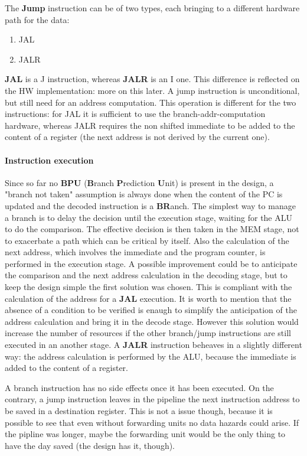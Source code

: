\documentclass[a4paper]{article}
\begin{document}
The \textbf{Jump} instruction can be of two types, each bringing to a different hardware path for the data:
\begin{enumerate}
	\item JAL
	\item JALR
\end{enumerate}
\textbf{JAL} is a J instruction, whereas \textbf{JALR} is an I one. This difference is reflected on the HW implementation: more on this later.
A jump instruction is unconditional, but still need for an address computation. This operation is different for the two instructions: for JAL it is sufficient to use the branch-addr-computation hardware, whereas JALR requires the non shifted immediate to be added to the content of a register (the next address is not derived by the current one).

\paragraph{Instruction execution}
Since so far no \textbf{BPU} (\textbf{B}ranch \textbf{P}rediction \textbf{U}nit) is present in the design, a "branch not taken" assumption is always done when the content of the PC is updated and the decoded instruction is a \textbf{BR}anch. The simplest way to manage a branch is to delay the decision until the execution stage, waiting for the ALU to do the comparison. The effective decision is then taken in the MEM stage, not to exacerbate a path which can be critical by itself. 
Also the calculation of the next address, which involves the immediate and the program counter, is performed in the execution stage.
A possible improvement could be to anticipate the comparison and the next address calculation in the decoding stage, but to keep the design simple the first solution was chosen.
This is compliant with the calculation of the address for a \textbf{JAL} execution. It is worth to mention that the absence of a condition to be verified is enaugh to simplify the anticipation of the address calculation and bring it in the decode stage. However this solution would increase the number of resources if the other branch/jump instructions are still executed in an another stage.
A \textbf{JALR} instruction beheaves in a slightly different way: the address calculation is performed by the ALU, because the immediate is added to the content of a register.

A branch instruction has no side effects once it has been executed. On the contrary, a jump instruction leaves in the pipeline the next instruction address to be saved in a destination register. This is not a issue though, because it is possible to see that even without forwarding units no data hazards could arise. If the pipline was longer, maybe the forwarding unit would be the only thing to have the day saved (the design has it, though).
\end{document}
